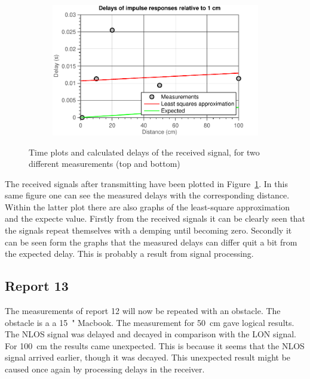 \documentclass[11pt,titlepage]{report}
\begin{document}
\begin{figure}[H]
\begin{subfigure}{0.49\textwidth}
	\end{subfigure}
	\begin{subfigure}{0.49\textwidth}
		\includegraphics[width=\textwidth]{../../deliverable-7-resources/figures/ass-1/report-11-12-13/ass-1-report-13-delays-set-2.pdf}
	\end{subfigure}
	\caption{Time plots and calculated delays of the received signal, for two different measurements (top and bottom)}
	\label{fig:rep12-los}
\end{figure}

	The received signals after transmitting have been plotted in Figure~\ref{fig:rep12-los}. In this same figure one can see the measured delays with the corresponding distance. Within the latter plot there are also graphs of the least-square approximation and the expecte value. Firstly from the received signals it can be clearly seen that the signals repeat themselves with a demping until becoming zero. Secondly it can be seen form the graphs that the measured delays can differ quit a bit from the expected delay. This is probably a result from signal processing.






\subsection{Report 13}
The measurements of report 12 will now be repeated with an obstacle. The obstacle is a a \SI{15}{"} Macbook. The measurement for \SI{50}{cm} gave logical results. The NLOS signal was delayed and decayed in comparison with the LON signal. For \SI{100}{cm} the results came unexpected. This is because it seems that the NLOS signal arrived earlier, though it was decayed. This unexpected result might be caused once again by processing delays in the receiver. 
\end{document}
